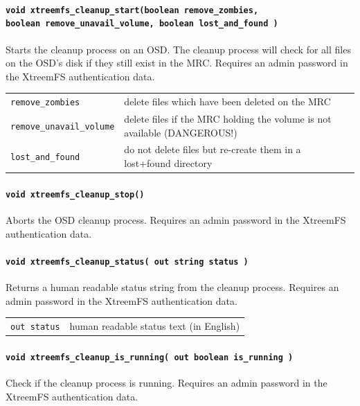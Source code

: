 \paragraph{\texttt{void xtreemfs\_cleanup\_start(boolean remove\_zombies,\\boolean remove\_unavail\_volume, boolean lost\_and\_found~)}}
Starts the cleanup process on an OSD. The cleanup process will check for all files on the OSD's disk if they still exist in the MRC. Requires an admin password in the XtreemFS authentication data.

\begin{tabularx}{\textwidth}{lX}
 \texttt{remove\_zombies} & delete files which have been deleted on the MRC\index{MRC}\\
 \texttt{remove\_unavail\_volume} & delete files if the MRC\index{MRC} holding the volume is not available (DANGEROUS!)\\
 \texttt{lost\_and\_found} & do not delete files but re-create them in a lost+found directory\\
\end{tabularx}


\paragraph{\texttt{void xtreemfs\_cleanup\_stop()}}
Aborts the OSD cleanup process. Requires an admin password in the XtreemFS authentication data.


\paragraph{\texttt{void xtreemfs\_cleanup\_status( out string status~)}}
Returns a human readable status string from the cleanup process. Requires an admin password in the XtreemFS authentication data.

\begin{tabularx}{\textwidth}{lX}
 \texttt{out status} & human readable status text (in English)\\
\end{tabularx}


\paragraph{\texttt{void xtreemfs\_cleanup\_is\_running( out boolean is\_running~)}}
Check if the cleanup process is running. Requires an admin password in the XtreemFS authentication data.

